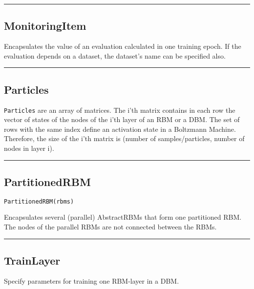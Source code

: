 \noindent\rule{\textwidth}{1pt}
\subsection*{MonitoringItem}  \label{bms_MonitoringItem}
Encapsulates the value of an evaluation calculated in one training epoch. If the evaluation depends on a dataset, the dataset's name can be specified also.

\noindent\rule{\textwidth}{1pt}
\subsection*{Particles}  \label{bms_Particles}
\texttt{Particles} are an array of matrices. The i'th matrix contains in each row the vector of states of the nodes of the i'th layer of an RBM or a DBM. The set of rows with the same index define an activation state in a Boltzmann Machine. Therefore, the size of the i'th matrix is (number of samples/particles, number of nodes in layer i).

\noindent\rule{\textwidth}{1pt}
\subsection*{PartitionedRBM}  \label{bms_PartitionedRBM}
\begin{verbatim}
PartitionedRBM(rbms)
\end{verbatim}
Encapsulates several (parallel) AbstractRBMs that form one partitioned RBM. The nodes of the parallel RBMs are not connected between the RBMs.

\noindent\rule{\textwidth}{1pt}
\subsection*{TrainLayer}  \label{bms_TrainLayer}
Specify parameters for training one RBM-layer in a DBM.

